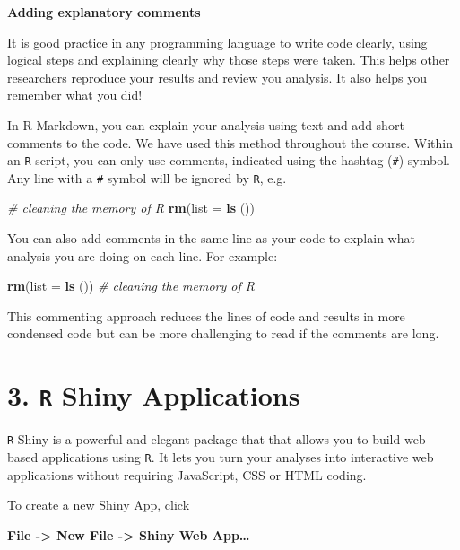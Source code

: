 \documentclass[
]{article}
\newenvironment{Shaded}{\begin{snugshade}}{\end{snugshade}}
\newcommand{\CommentTok}[1]{\textcolor[rgb]{0.56,0.35,0.01}{\textit{#1}}}
\newcommand{\DataTypeTok}[1]{\textcolor[rgb]{0.13,0.29,0.53}{#1}}
\newcommand{\KeywordTok}[1]{\textcolor[rgb]{0.13,0.29,0.53}{\textbf{#1}}}
\newcommand{\NormalTok}[1]{#1}
\begin{document}
\textbf{Adding explanatory comments}

It is good practice in any programming language to write code clearly,
using logical steps and explaining clearly why those steps were taken.
This helps other researchers reproduce your results and review you
analysis. It also helps you remember what you did!

In R Markdown, you can explain your analysis using text and add short
comments to the code. We have used this method throughout the course.
Within an \texttt{R} script, you can only use comments, indicated using
the hashtag (\texttt{\#}) symbol. Any line with a \texttt{\#} symbol
will be ignored by \texttt{R}, e.g.

\begin{Shaded}
\begin{Highlighting}[]
\CommentTok{# cleaning the memory of R}
\KeywordTok{rm}\NormalTok{(}\DataTypeTok{list =} \KeywordTok{ls}\NormalTok{ ()) }
\end{Highlighting}
\end{Shaded}

You can also add comments in the same line as your code to explain what
analysis you are doing on each line. For example:

\begin{Shaded}
\begin{Highlighting}[]
\KeywordTok{rm}\NormalTok{(}\DataTypeTok{list =} \KeywordTok{ls}\NormalTok{ ()) }\CommentTok{# cleaning the memory of R}
\end{Highlighting}
\end{Shaded}

This commenting approach reduces the lines of code and results in more
condensed code but can be more challenging to read if the comments are
long.

\hypertarget{r-shiny-applications}{%
\section{\texorpdfstring{3. \texttt{R} Shiny
Applications}{3. R Shiny Applications}}\label{r-shiny-applications}}

\texttt{R} Shiny is a powerful and elegant package that that allows you
to build web-based applications using \texttt{R}. It lets you turn your
analyses into interactive web applications without requiring JavaScript,
CSS or HTML coding.

To create a new Shiny App, click

\textbf{File -\textgreater{} New File -\textgreater{} Shiny Web
App\ldots{}}
\end{document}
